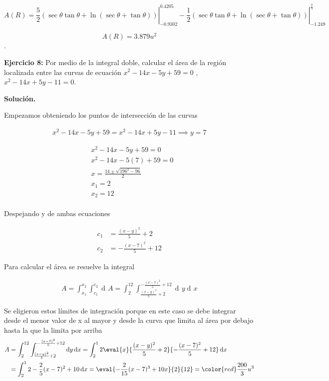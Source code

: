 \documentclass[12pt]{article}
\DeclareMathOperator{\di}{d\!}
\begin{document}
\[A(R) = \left. {\frac{5}{2}(\sec \theta \tan \theta  + \ln \left( {\sec \theta  + \tan \theta } \right))} \right|_{ - 0.9302}^{0.4205} - \left. {\frac{1}{2}(\sec \theta \tan \theta  + \ln \left( {\sec \theta  + \tan \theta } \right))} \right|_{ - 1.249}^{\frac{\pi }{4}}\]

	\[A(R)=3.879{{u}^{2}}\].

\noindent \textbf{Ejercicio 8:} Por medio de la integral doble, calcular el área
de la región localizada entre las curvas de ecuación $x^2 -14x -5y +59 = 0$ , 
$x^2-14x+5y-11=0$.

\vspace{5mm}

\noindent \textbf{Solución.}
 
\vspace{5mm}

Empezamos obteniendo los puntos de intersección de las curvas

\begin{align*}
	x^2 -14x -5y +59 = x^2-14x+5y-11 \implies y = 7
\end{align*}

\begin{align*}
	&x^2 -14x -5y +59 = 0 \\
	&x^2 -14x -5(7) +59 = 0 \\
	&x = \frac{14 \pm \sqrt{196^2-96 }}{2} \\
	&x_1 = 2 \\
	&x_2 = 12 \\
\end{align*}

Despejando y de ambas ecuaciones

\begin{align*}
	c_1 &= \frac{(x-y)^2}{5} + 2 \\
	c_2 &= -\frac{(x-7)^2}{5}+12
\end{align*}

Para calcular el área se resuelve la integral 

\begin{align*}
	A = \int_{x_1}^{x_2} \int_{c_1}^{c_2} \di A = \int_{2}^{12} \int_{\frac{(x-y)^2}{5} + 2}^{-\frac{(x-7)^2}{5}+12} \di y \di x
\end{align*}

Se eligieron estos límites de integración porque en este caso se debe integrar desde el menor
valor de x al mayor y desde la curva que limita al área por debajo hasta la que la limita
por arriba
\begin{align*}
A &= \int_{2}^{12} \int_{\frac{(x-y)^2}{5} + 2}^{-\frac{(x-7)^2}{5}+12} \di y \di x 
= \int_2^12 \eval{x}{\frac{(x-y)^2}{5} + 2}{-\frac{(x-7)^2}{5}+12} \di x \\
&= \int_2^12 -\frac{2}{5}(x-7)^2+10 \di x = \eval{-\frac{2}{15}(x-7)^3+10x}{2}{12}
=\color{red}\frac{200}{3} u^3 
\end{align*}
\end{document}
